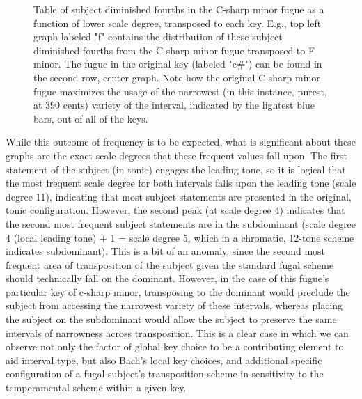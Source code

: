 \begin{figure}[H]
\vspace{1.5em}
    \centering
    \caption[Table of subject diminished fourths in the C-sharp minor fugue as a function of lower scale degree, transposed to each key. ]{Table of subject diminished fourths in the C-sharp minor fugue as a function of lower scale degree, transposed to each key. E.g., top left graph labeled "f" contains the distribution of these subject diminished fourths from the C-sharp minor fugue transposed to F minor. The fugue in the original key (labeled "c\#") can be found in the second row, center graph. Note how the original C-sharp minor fugue maximizes the usage of the narrowest (in this instance, purest, at 390 cents) variety of the interval, indicated by the lightest blue bars, out of all of the keys.}
\end{figure}    While this outcome of frequency is to be expected, what is significant
about these graphs are the exact scale degrees that these frequent
values fall upon. The first statement of the subject (in tonic) engages
the leading tone, so it is logical that the most frequent scale degree
for both intervals falls upon the leading tone (scale degree 11),
indicating that most subject statements are presented in the original,
tonic configuration. However, the second peak (at scale degree 4)
indicates that the second most frequent subject statements are in the
subdominant (scale degree 4 (local leading tone) + 1 = scale degree 5,
which in a chromatic, 12-tone scheme indicates subdominant). This is a
bit of an anomaly, since the second most frequent area of transposition
of the subject given the standard fugal scheme should technically fall
on the dominant. However, in the case of this fugue's particular key of
c-sharp minor, transposing to the dominant would preclude the subject
from accessing the narrowest variety of these intervals, whereas placing
the subject on the subdominant would allow the subject to preserve the
same intervals of narrowness across transposition. This is a clear case
in which we can observe not only the factor of global key choice to be a
contributing element to aid interval type, but also Bach's local key
choices, and additional specific configuration of a fugal subject's
transposition scheme in sensitivity to the temperamental scheme within a
given key.

